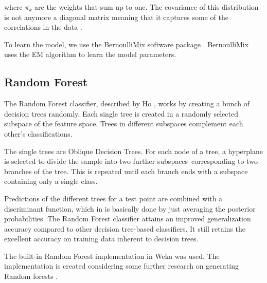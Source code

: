 where $\pi_k$ are the weights that sum up to one. The covariance of this
distribution is not anymore a diagonal matrix meaning that it captures
some of the correlations in the data \cite{bishop2006pattern}.

To learn the model, we use the BernoulliMix software package
\cite{bmix}. BernoulliMix uses the EM algorithm to learn the model
parameters.

\subsection{Random Forest}

The Random Forest classifier, described by Ho \cite{ho1995random}, works
by creating a bunch of decision trees randomly. Each single tree is
created in a randomly selected subspace of the feature space. Trees in
different subspaces complement each other's classifications.

The single trees are Oblique Decision Trees. For each node of a tree, a
hyperplane is selected to divide the sample into two further
subspaces--corresponding to two branches of the tree. This is repeated
until each branch ends with a subspace containing only a single class.

Predictions of the different trees for a test point are combined with a
discriminant function, which in \cite{ho1995random} is basically done by
just averaging the posterior probabilities. The Random Forest classifier
attains an improved generalization accuracy compared to other decision
tree-based classifiers. It still retains the excellent accuracy on
training data inherent to decision trees. \cite{ho1995random}

The built-in Random Forest implementation in Weka \cite{weka} was used.
The implementation is created considering some further research on
generating Random forests \cite{breiman2001random}.
